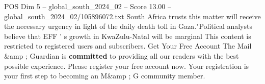 \begin{textsample}{POS Dim 5 – global\_south\_2024\_02 – Score 13.00 – global\_south\_2024\_02/105896072.txt}
South Africa trusts this matter will receive the necessary urgency in light of the daily death toll in Gaza."Political analysts believe that EFF ' s growth in KwaZulu-Natal will be marginal This content is restricted to registered users and subscribers.
Get Your Free Account The Mail \&amp ; Guardian is \textbf{committed} to providing all our readers with the best possible experience.
Please register your free account now.
Your registration is your first step to becoming an M\&amp ; G community member.

\end{textsample}
